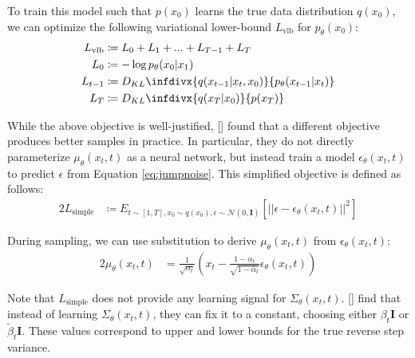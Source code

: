 \documentclass{article}
\newcommand{\kld}[2]{\ensuremath{D_{KL}\infdivx{#1}{#2}}\xspace}
\newcommand{\namecite}[1]{\citeauthor{#1} [\citenum{#1}]}
\begin{document}
To train this model such that $p(x_0)$ learns the true data distribution $q(x_0)$, we can optimize the following variational lower-bound $L_{\text{vlb}}$ for $p_{\theta}(x_0)$:
%
\begin{alignat}{2}
    L_{\text{vlb}} &\coloneqq L_0 + L_1 + ... + L_{T-1} + L_T \label{eq:loss} \\
    L_{0} &\coloneqq -\log p_{\theta}(x_0 | x_1) \label{eq:loss0} \\
    L_{t-1} &\coloneqq \kld{q(x_{t-1}|x_t,x_0)}{p_{\theta}(x_{t-1}|x_t)} \label{eq:losst} \\
    L_{T} &\coloneqq \kld{q(x_T | x_0)}{p(x_T)} \label{eq:lossT}
\end{alignat}

While the above objective is well-justified, \namecite{ddpm} found that a different objective produces better samples in practice. In particular, they do not directly parameterize $\mu_{\theta}(x_t,t)$ as a neural network, but instead train a model $\epsilon_{\theta}(x_t,t)$ to predict $\epsilon$ from Equation \ref{eq:jumpnoise}. This simplified objective is defined as follows:
%
\begin{alignat}{2}
    L_{\text{simple}} &\coloneqq E_{t \sim [1,T],x_0 \sim q(x_0), \epsilon \sim \mathcal{N}(0, \mathbf{I})}[||\epsilon - \epsilon_{\theta}(x_t, t)||^2] \label{eq:lsimple}
\end{alignat}

During sampling, we can use substitution to derive $\mu_{\theta}(x_t,t)$ from $\epsilon_{\theta}(x_t,t)$:
%
\begin{alignat}{2}
    \mu_{\theta}(x_t,t) &= \frac{1}{\sqrt{\alpha_t}}\left(x_t-\frac{1-\alpha_t}{\sqrt{1-\bar{\alpha}_t}}\epsilon_{\theta}(x_t, t)\right) \label{eq:mufromeps}
\end{alignat}

Note that $L_{\text{simple}}$ does not provide any learning signal for $\Sigma_{\theta}(x_t,t)$. \namecite{ddpm} find that instead of learning $\Sigma_{\theta}(x_t,t)$, they can fix it to a constant, choosing either $\beta_t \mathbf{I}$ or $\tilde{\beta}_t \mathbf{I}$. These values correspond to upper and lower bounds for the true reverse step variance.
\end{document}
